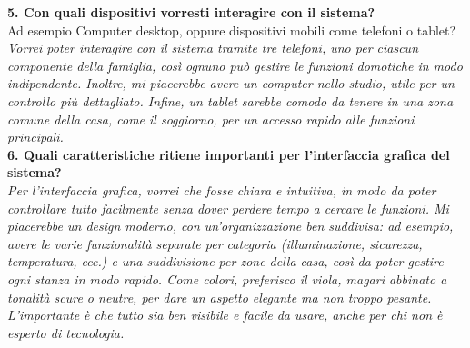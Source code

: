 \documentclass{exam}
\begin{document}
\clearpage
\noindent\textbf{5. Con quali dispositivi vorresti interagire con il sistema?}\\[1.5mm]
Ad esempio Computer desktop, oppure dispositivi mobili come telefoni o tablet?\\[2mm]
\emph{Vorrei poter interagire con il sistema tramite tre telefoni, uno per ciascun componente della famiglia, così ognuno può gestire le funzioni domotiche in modo indipendente. Inoltre, mi piacerebbe avere un computer nello studio, utile per un controllo più dettagliato. Infine, un tablet sarebbe comodo da tenere in una zona comune della casa, come il soggiorno, per un accesso rapido alle funzioni principali.}\\

\clearpage
\noindent\textbf{6. Quali caratteristiche ritiene importanti per l’interfaccia grafica del sistema?}\\[2mm]
\emph{Per l’interfaccia grafica, vorrei che fosse chiara e intuitiva, in modo da poter controllare tutto facilmente senza dover perdere tempo a cercare le funzioni. Mi piacerebbe un design moderno, con un’organizzazione ben suddivisa: ad esempio, avere le varie funzionalità separate per categoria (illuminazione, sicurezza, temperatura, ecc.) e una suddivisione per zone della casa, così da poter gestire ogni stanza in modo rapido.
Come colori, preferisco il viola, magari abbinato a tonalità scure o neutre, per dare un aspetto elegante ma non troppo pesante. L’importante è che tutto sia ben visibile e facile da usare, anche per chi non è esperto di tecnologia.}
\end{document}
